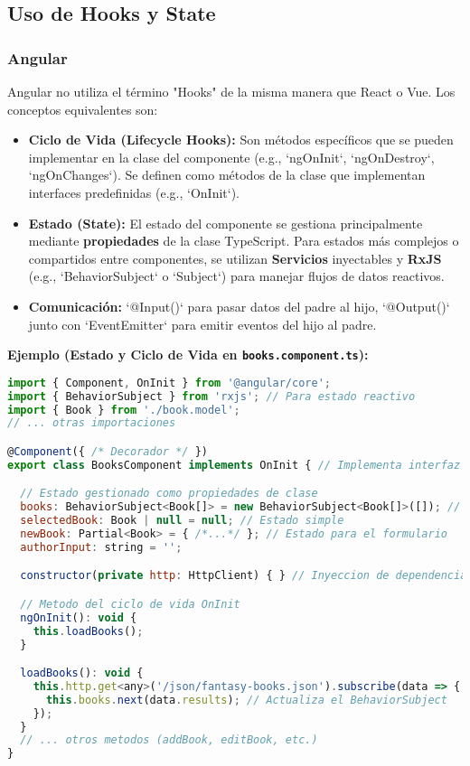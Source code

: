 \documentclass[11pt, a4paper]{article}
\begin{document}
\subsection{Uso de Hooks y State}

\subsubsection{Angular}
Angular no utiliza el término "Hooks" de la misma manera que React o Vue. Los conceptos equivalentes son:
\begin{itemize}
    \item \textbf{Ciclo de Vida (Lifecycle Hooks):} Son métodos específicos que se pueden implementar en la clase del componente (e.g., `ngOnInit`, `ngOnDestroy`, `ngOnChanges`). Se definen como métodos de la clase que implementan interfaces predefinidas (e.g., `OnInit`).
    \item \textbf{Estado (State):} El estado del componente se gestiona principalmente mediante \textbf{propiedades} de la clase TypeScript. Para estados más complejos o compartidos entre componentes, se utilizan \textbf{Servicios} inyectables y \textbf{RxJS} (e.g., `BehaviorSubject` o `Subject`) para manejar flujos de datos reactivos.
    \item \textbf{Comunicación:} `@Input()` para pasar datos del padre al hijo, `@Output()` junto con `EventEmitter` para emitir eventos del hijo al padre.
\end{itemize}

\textbf{Ejemplo (Estado y Ciclo de Vida en \texttt{books.component.ts}):}
\begin{lstlisting}[language=JavaScript]
import { Component, OnInit } from '@angular/core';
import { BehaviorSubject } from 'rxjs'; // Para estado reactivo
import { Book } from './book.model';
// ... otras importaciones

@Component({ /* Decorador */ })
export class BooksComponent implements OnInit { // Implementa interfaz de ciclo de vida

  // Estado gestionado como propiedades de clase
  books: BehaviorSubject<Book[]> = new BehaviorSubject<Book[]>([]); // Estado reactivo con RxJS
  selectedBook: Book | null = null; // Estado simple
  newBook: Partial<Book> = { /*...*/ }; // Estado para el formulario
  authorInput: string = '';

  constructor(private http: HttpClient) { } // Inyeccion de dependencias

  // Metodo del ciclo de vida OnInit
  ngOnInit(): void {
    this.loadBooks();
  }

  loadBooks(): void {
    this.http.get<any>('/json/fantasy-books.json').subscribe(data => {
      this.books.next(data.results); // Actualiza el BehaviorSubject
    });
  }
  // ... otros metodos (addBook, editBook, etc.)
}
\end{lstlisting}
\end{document}
